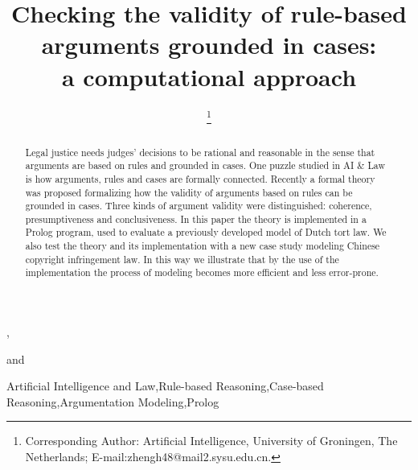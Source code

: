 \documentclass{IOS-Book-Article}
\begin{document}
\pagestyle{headings}
\def\thepage{}

\begin{frontmatter} 

\title{Checking the validity of rule-based arguments grounded in cases: \\a computational approach}


\author[A]{ \thanks{Corresponding Author: Artificial Intelligence, University of Groningen, The Netherlands; E-mail:zhengh48@mail2.sysu.edu.cn.}}, \author[B]{ } and \author[A]{ }

\address[A]{Artificial Intelligence, University of Groningen, The Netherlands}
\address[B]{Institute of Logic and Cognition, Sun Yat-sen University, Guangzhou, China}

\begin{abstract}
Legal justice needs judges' decisions to be rational and reasonable in the sense that arguments are based on rules and grounded in cases.  One puzzle studied in AI \& Law is how arguments, rules and cases are formally connected. Recently a formal theory was proposed formalizing how the validity of arguments based on rules can be grounded in cases. Three kinds of argument validity were distinguished: coherence, presumptiveness and conclusiveness. In this paper the theory is implemented in a Prolog program, used to evaluate a previously developed model of Dutch tort law. We also test the theory and its implementation with a new case study modeling Chinese copyright infringement law. In this way we illustrate that by the use of the implementation the process of modeling becomes more efficient and less error-prone.
\end{abstract}

\begin{keyword}
Artificial Intelligence and Law\sep Rule-based Reasoning\sep Case-based Reasoning\sep Argumentation Modeling\sep Prolog
\end{keyword}
\end{frontmatter}
\end{document}
